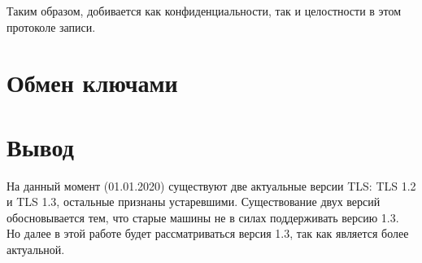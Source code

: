     Таким образом, добивается как конфиденциальности, так и целостности в этом протоколе записи.   
    
    \section{Обмен ключами} 
    
    
        
    \section{Вывод}

        На данный момент (01.01.2020) существуют две актуальные версии TLS: TLS 1.2 и TLS 1.3, остальные признаны устаревшими. Существование двух версий обосновывается тем, что старые машины не в силах поддерживать версию 1.3. Но далее в этой работе будет рассматриваться версия 1.3, так как является более актуальной.